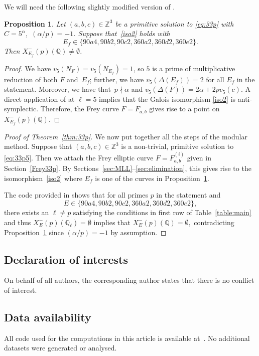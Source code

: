 \documentclass[12pt]{amsart}
\numberwithin{equation}{section}
\newtheorem{proposition}[equation]{Proposition}
\theoremstyle{definition}
\newcommand{\Q}{\mathbb{Q}}
\newcommand{\Z}{\mathbb{Z}}
\begin{document}
We will need the following slightly modified version of \cite[Proposition 6.1]{BBF}.

\begin{proposition}\label{prop:sym5}
    Let $(a,b,c)\in\Z^3$ be a primitive solution to \eqref{eq:33p} with $C=5^\alpha$,~$(\alpha/p)=-1$. Suppose that~\eqref{iso2} holds with $$E_f \in \{ 90a4,90b2,90c2,360a2,360d2,360e2 \}.$$
    Then $X_{E_f}^-(p)(\Q)\neq \emptyset$.
\end{proposition}
\begin{proof}
    We have $v_5(N_F) = v_5(N_{E_f}) = 1$, so $5$ is a prime of multiplicative
reduction of both $F$ and~$E_f$; further, we have $v_5(\Delta(E_f)) =2$ for all $E_f$ in the statement.
Moreover, we have that~$p \nmid \alpha$ and
$v_5(\Delta(F)) = 2\alpha + 2pv_5(c)$.
A direct application of
\cite[Proposition~2]{KO} at $\ell = 5$ implies that the Galois isomorphism \eqref{iso2} is anti-symplectic. Therefore, the Frey curve $F = F_{a,b}$ gives rise to a point on $X_{E_f}^-(p)(\Q)$.
\end{proof}
\begin{proof}[Proof of Theorem~\ref{thm:33p}]
We now put together all the steps of the modular method. Suppose that $(a,b,c)\in \Z^3$ is a non-trivial, primitive solution to \eqref{eq:33p5}. Then we attach the Frey elliptic curve $F = F^{(i)}_{a,b}$ given in Section~\ref{Frey33p}. By Sections~\ref{sec:MLL}--\ref{sec:elimination}, this gives rise to the isomorphism~\eqref{iso2} where $E_f$ is one of the curves in Proposition~\ref{prop:sym5}.

The code provided in \cite{git} shows that for all primes $p$ in the statement and $$E\in \{ 90a4,90b2,90c2, 360a2,360d2,360e2\},$$ there exists an $\ell \neq p$ satisfying the conditions in first row of Table~\ref{table:main} and thus
$X_E^-(p)(\Q_\ell)= \emptyset$ implies that $X_{E}^-(p)(\Q)=\emptyset,$
contradicting Proposition~\ref {prop:sym5} since $(\alpha/p)=-1$ by assumption.
\end{proof}

\subsection{Declaration of interests}
On behalf of all authors, the corresponding author states that there is no conflict of interest.
\vspace{-2mm}
\subsection{Data availability }
All code used for the computations in this article is available 
at~\cite{git}. No additional datasets were generated or analysed.
\end{document}
